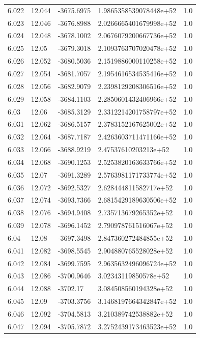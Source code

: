 \begin{tabular}{lllll}
6.022 & 12.044 & -3675.6975 & 1.9865358539078448e+52 & 1.0 \\
6.023 & 12.046 & -3676.8988 & 2.0266665401679998e+52 & 1.0 \\
6.024 & 12.048 & -3678.1002 & 2.0676079200667736e+52 & 1.0 \\
6.025 & 12.05 & -3679.3018 & 2.1093763707020478e+52 & 1.0 \\
6.026 & 12.052 & -3680.5036 & 2.1519886000110258e+52 & 1.0 \\
6.027 & 12.054 & -3681.7057 & 2.1954616534535416e+52 & 1.0 \\
6.028 & 12.056 & -3682.9079 & 2.2398129208306516e+52 & 1.0 \\
6.029 & 12.058 & -3684.1103 & 2.2850601432406966e+52 & 1.0 \\
6.03 & 12.06 & -3685.3129 & 2.3312214201758797e+52 & 1.0 \\
6.031 & 12.062 & -3686.5157 & 2.3783152167625002e+52 & 1.0 \\
6.032 & 12.064 & -3687.7187 & 2.4263603711471166e+52 & 1.0 \\
6.033 & 12.066 & -3688.9219 & 2.47537610203213e+52 & 1.0 \\
6.034 & 12.068 & -3690.1253 & 2.5253820163633766e+52 & 1.0 \\
6.035 & 12.07 & -3691.3289 & 2.5763981171733774e+52 & 1.0 \\
6.036 & 12.072 & -3692.5327 & 2.628444811582717e+52 & 1.0 \\
6.037 & 12.074 & -3693.7366 & 2.6815429189630506e+52 & 1.0 \\
6.038 & 12.076 & -3694.9408 & 2.735713679265352e+52 & 1.0 \\
6.039 & 12.078 & -3696.1452 & 2.790978761516067e+52 & 1.0 \\
6.04 & 12.08 & -3697.3498 & 2.847360272484855e+52 & 1.0 \\
6.041 & 12.082 & -3698.5545 & 2.904880765528028e+52 & 1.0 \\
6.042 & 12.084 & -3699.7595 & 2.9635632496096724e+52 & 1.0 \\
6.043 & 12.086 & -3700.9646 & 3.02343119850578e+52 & 1.0 \\
6.044 & 12.088 & -3702.17 & 3.084508560194328e+52 & 1.0 \\
6.045 & 12.09 & -3703.3756 & 3.1468197664342847e+52 & 1.0 \\
6.046 & 12.092 & -3704.5813 & 3.210389742538882e+52 & 1.0 \\
6.047 & 12.094 & -3705.7872 & 3.2752439173463523e+52 & 1.0 \\

\end{tabular}
